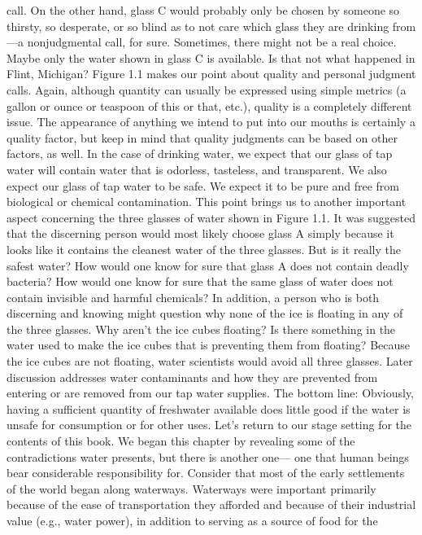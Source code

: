 \documentclass{article}
\begin{document}
call. On the other hand, glass C would probably only be chosen by
someone so thirsty, so desperate, or so blind as to not care which glass
they are drinking from---a nonjudgmental call, for sure. Sometimes,
there might not be a real choice. Maybe only the water shown in glass C
is available. Is that not what happened in Flint, Michigan? Figure 1.1
makes our point about quality and personal judgment calls. Again,
although quantity can usually be expressed using simple metrics (a
gallon or ounce or teaspoon of this or that, etc.), quality is a
completely different issue. The appearance of anything we intend to put
into our mouths is certainly a quality factor, but keep in mind that
quality judgments can be based on other factors, as well. In the case of
drinking water, we expect that our glass of tap water will contain water
that is odorless, tasteless, and transparent. We also expect our glass
of tap water to be safe. We expect it to be pure and free from
biological or chemical contamination. This point brings us to another
important aspect concerning the three glasses of water shown in Figure
1.1. It was suggested that the discerning person would most likely
choose glass A simply because it looks like it contains the cleanest
water of the three glasses. But is it really the safest water? How would
one know for sure that glass A does not contain deadly bacteria? How
would one know for sure that the same glass of water does not contain
invisible and harmful chemicals? In addition, a person who is both
discerning and knowing might question why none of the ice is floating in
any of the three glasses. Why aren't the ice cubes floating? Is there
something in the water used to make the ice cubes that is preventing
them from floating? Because the ice cubes are not floating, water
scientists would avoid all three glasses. Later discussion addresses
water contaminants and how they are prevented from entering or are
removed from our tap water supplies. The bottom line: Obviously, having
a sufficient quantity of freshwater available does little good if the
water is unsafe for consumption or for other uses. Let's return to our
stage setting for the contents of this book. We began this chapter by
revealing some of the contradictions water presents, but there is
another one--- one that human beings bear considerable responsibility
for. Consider that most of the early settlements of the world began
along waterways. Waterways were important primarily because of the ease
of transportation they afforded and because of their industrial value
(e.g., water power), in addition to serving as a source of food for the
\end{document}
